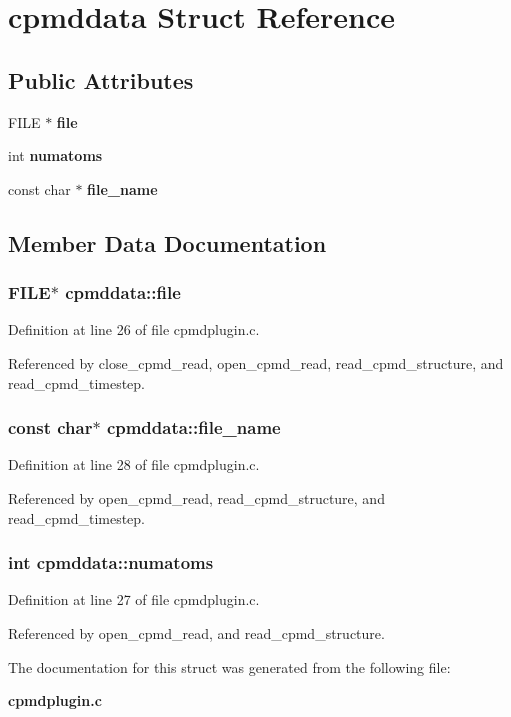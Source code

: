 \section{cpmddata  Struct Reference}
\label{structcpmddata}
\subsection*{Public Attributes}
\begin{CompactItemize}
\item 
FILE $\ast$ {\bf file}
\item 
int {\bf numatoms}
\item 
const char $\ast$ {\bf file\_\-name}
\end{CompactItemize}


\subsection{Member Data Documentation}
\subsubsection{\setlength{\rightskip}{0pt plus 5cm}FILE$\ast$ cpmddata::file}\label{structcpmddata_m0}




Definition at line 26 of file cpmdplugin.c.

Referenced by close\_\-cpmd\_\-read, open\_\-cpmd\_\-read, read\_\-cpmd\_\-structure, and read\_\-cpmd\_\-timestep.
\subsubsection{\setlength{\rightskip}{0pt plus 5cm}const char$\ast$ cpmddata::file\_\-name}\label{structcpmddata_m2}




Definition at line 28 of file cpmdplugin.c.

Referenced by open\_\-cpmd\_\-read, read\_\-cpmd\_\-structure, and read\_\-cpmd\_\-timestep.
\subsubsection{\setlength{\rightskip}{0pt plus 5cm}int cpmddata::numatoms}\label{structcpmddata_m1}




Definition at line 27 of file cpmdplugin.c.

Referenced by open\_\-cpmd\_\-read, and read\_\-cpmd\_\-structure.

The documentation for this struct was generated from the following file:\begin{CompactItemize}
\item 
{\bf cpmdplugin.c}\end{CompactItemize}
